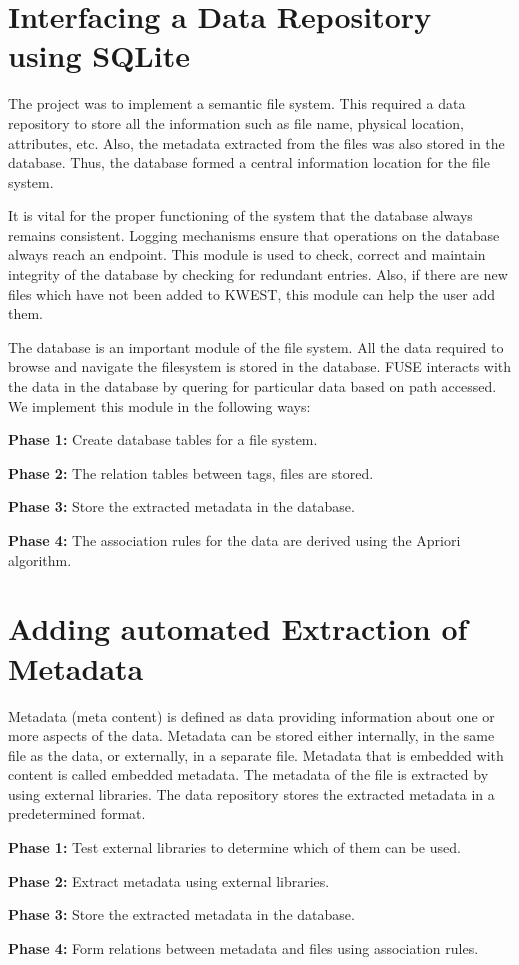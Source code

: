 \section{Interfacing a Data Repository using SQLite}
The project was to implement a semantic file system. This required a data repository to store all the information such as file name, physical location, attributes, etc. Also, the metadata extracted from the files was also stored in the database. Thus, the database formed a central information location for the file system.


It is vital for the proper functioning of the system that the database always remains consistent. Logging mechanisms ensure that operations on the database always reach an endpoint. This module is used to check, correct and maintain integrity of the database by checking for redundant entries. Also, if there are new files which have not been added to KWEST, this module can help the user add them.


The database is an important module of the file system. All the data required to browse and navigate the filesystem is stored in the database. FUSE interacts with the data in the database by quering for particular data based on path accessed. We implement this module in the following ways:
\begin{list}{•}{•}
\item \textbf{Phase 1:} Create database tables for a file system.
\item \textbf{Phase 2:} The relation tables between tags, files are stored.
\item \textbf{Phase 3:} Store the extracted metadata in the database.
\item \textbf{Phase 4:} The association rules for the data are derived using the Apriori algorithm.
\end{list}

\section{Adding automated Extraction of Metadata}
Metadata (meta content) is defined as data providing information about one or more aspects of the data. Metadata can be stored either internally, in the same file as the data, or externally, in a separate file. Metadata that is embedded with content is called embedded metadata.
The metadata of the file is extracted by using external libraries. The data repository stores the extracted metadata in a predetermined format. 
\begin{list}{•}{•}
\item \textbf{Phase 1:} Test external libraries to determine which of them can be used.
\item \textbf{Phase 2:} Extract metadata using external libraries.
\item \textbf{Phase 3:} Store the extracted metadata in the database.
\item \textbf{Phase 4:} Form relations between metadata and files using association rules.
\end{list}

